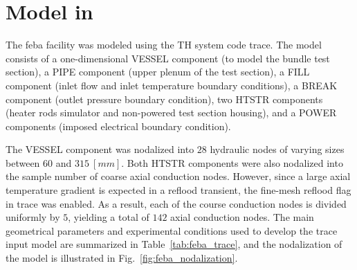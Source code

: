 \section{ Model in }\label{sec:reflood_feba_trace}

The \gls{feba} facility was modeled using the TH system code \gls{trace}.
The model consists of a one-dimensional \textsc{VESSEL} component (to model the bundle test section),
a \textsc{PIPE} component (upper plenum of the test section), 
a \textsc{FILL} component (inlet flow and inlet temperature boundary conditions),
a \textsc{BREAK} component (outlet pressure boundary condition),
two \textsc{HTSTR} components (heater rods simulator and non-powered test section housing),
and a \textsc{POWER} components (imposed electrical boundary condition).

The \textsc{VESSEL} component was nodalized into $28$ hydraulic nodes of varying sizes between $60$ and $315 \ [mm]$.
Both \textsc{HTSTR} components were also nodalized into the sample number of coarse axial conduction nodes.
However, since a large axial temperature gradient is expected in a reflood transient,
the fine-mesh reflood flag in \gls{trace} was enabled.
As a result, each of the course conduction nodes is divided uniformly by $5$,
yielding a total of $142$ axial conduction nodes.
The main geometrical parameters and experimental conditions used to develop the \gls{trace} input model
are summarized in Table~\ref{tab:feba_trace},
and the nodalization of the model is illustrated in Fig.~\ref{fig:feba_nodalization}.

